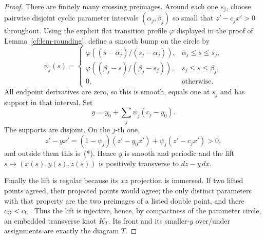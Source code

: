 \begin{proof}
There are finitely many crossing preimages.  Around each one $s_j$, choose
pairwise disjoint cyclic parameter intervals $(\alpha_j,\beta_j)$ so small that
$z'-c_jx'>0$ throughout.  Using the explicit flat transition profile
$\varphi$ displayed in the proof of Lemma~\ref{cf:lem-rounding}, define a smooth
bump on the circle by
\[
 \psi_j(s)=
 \begin{cases}
 \varphi\!\left((s-\alpha_j)/(s_j-\alpha_j)\right),&
       \alpha_j\le s\le s_j,\\
 \varphi\!\left((\beta_j-s)/(\beta_j-s_j)\right),&
       s_j\le s\le\beta_j,\\
 0,&\text{otherwise}.
 \end{cases}
\]
All endpoint derivatives are zero, so this is smooth, equals one at $s_j$ and
has support in that interval.  Set
\[
 y=y_0+\sum_j\psi_j(c_j-y_0).
\]
The supports are disjoint.  On the $j$-th one,
\[
 z'-yx'=(1-\psi_j)(z'-y_0x')+\psi_j(z'-c_jx')>0,
\]
and outside them this is~(*).  Hence $y$ is smooth and periodic and the lift
$s\mapsto(x(s),y(s),z(s))$ is positively transverse to $dz-y\,dx$.

Finally the lift is regular because its $xz$ projection is immersed.  If two
lifted points agreed, their projected points would agree; the only distinct
parameters with that property are the two preimages of a listed double point,
and there $c_{\rm O}<c_{\rm U}$.  Thus the lift is injective, hence, by
compactness of the parameter circle, an embedded transverse knot $K_T$.
Its front and its smaller-$y$ over/under assignments are exactly the
diagram $T$.


\end{proof}
